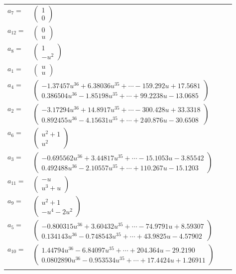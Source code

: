 \documentclass[1p]{elsarticle_modified}
\theoremstyle{definition}
\begin{document}
\begin{tabular}{m{7pt} m{180pt} m{7pt} m{180pt} }
\flushright $a_{7}=$&$\begin{pmatrix}1\\0\end{pmatrix}$ \\
\flushright $a_{12}=$&$\begin{pmatrix}0\\u\end{pmatrix}$ \\
\flushright $a_{8}=$&$\begin{pmatrix}1\\- u^2\end{pmatrix}$ \\
\flushright $a_{1}=$&$\begin{pmatrix}u\\u\end{pmatrix}$ \\
\flushright $a_{4}=$&$\begin{pmatrix}-1.37457 u^{36}+6.38036 u^{35}+\cdots-159.292 u+17.5681\\0.386504 u^{36}-1.85198 u^{35}+\cdots+99.2238 u-13.0685\end{pmatrix}$ \\
\flushright $a_{2}=$&$\begin{pmatrix}-3.17294 u^{36}+14.8917 u^{35}+\cdots-300.428 u+33.3318\\0.892455 u^{36}-4.15631 u^{35}+\cdots+240.876 u-30.6508\end{pmatrix}$ \\
\flushright $a_{6}=$&$\begin{pmatrix}u^2+1\\u^2\end{pmatrix}$ \\
\flushright $a_{3}=$&$\begin{pmatrix}-0.695562 u^{36}+3.44817 u^{35}+\cdots-15.1053 u-3.85542\\0.492488 u^{36}-2.10557 u^{35}+\cdots+110.267 u-15.1203\end{pmatrix}$ \\
\flushright $a_{11}=$&$\begin{pmatrix}- u\\u^3+u\end{pmatrix}$ \\
\flushright $a_{9}=$&$\begin{pmatrix}u^2+1\\- u^4-2 u^2\end{pmatrix}$ \\
\flushright $a_{5}=$&$\begin{pmatrix}-0.800315 u^{36}+3.60432 u^{35}+\cdots-74.9791 u+8.59307\\0.134143 u^{36}-0.748543 u^{35}+\cdots+43.9825 u-4.57902\end{pmatrix}$ \\
\flushright $a_{10}=$&$\begin{pmatrix}1.44794 u^{36}-6.84097 u^{35}+\cdots+204.364 u-29.2190\\0.0802890 u^{36}-0.953534 u^{35}+\cdots+17.4424 u+1.26911\end{pmatrix}$\\&\end{tabular}
\end{document}
